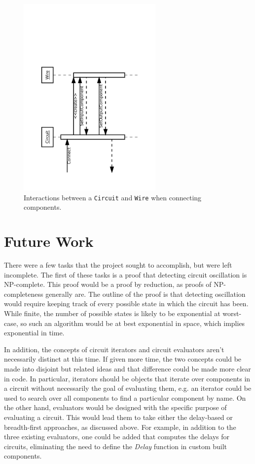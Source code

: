 \documentclass{article}
\newcommand{\ClassName}[1]{\texttt{#1}}
\newcommand{\FunctionName}[1]{\textit{#1}}
\begin{document}
\begin{figure}[H]
    \begin{center}
        \includegraphics[angle=270,width=200pt]{imgs/ComponentConnectionInteraction.pdf}
    \end{center}
    \caption{Interactions between a \ClassName{Circuit} and \ClassName{Wire} when connecting components.}
\end{figure}

\section{Future Work}

There were a few tasks that the project sought to accomplish, but were left incomplete. The first of these tasks is a proof that detecting circuit oscillation is NP-complete. This proof would be a proof by reduction, as proofs of NP-completeness generally are. The outline of the proof is that detecting oscillation would require keeping track of every possible state in which the circuit has been. While finite, the number of possible states is likely to be exponential at worst-case, so such an algorithm would be at best exponential in space, which implies exponential in time.

In addition, the concepts of circuit iterators and circuit evaluators aren’t necessarily distinct at this time. If given more time, the two concepts could be made into disjoint but related ideas and that difference could be made more clear in code. In particular, iterators should be objects that iterate over components in a circuit without necessarily the goal of evaluating them, e.g. an iterator could be used to search over all components to find a particular component by name. On the other hand, evaluators would be designed with the specific purpose of evaluating a circuit. This would lead them to take either the delay-based or breadth-first approaches, as discussed above. For example, in addition to the three existing evaluators, one could be added that computes the delays for circuits, eliminating the need to define the \FunctionName{Delay} function in custom built components.
\end{document}
